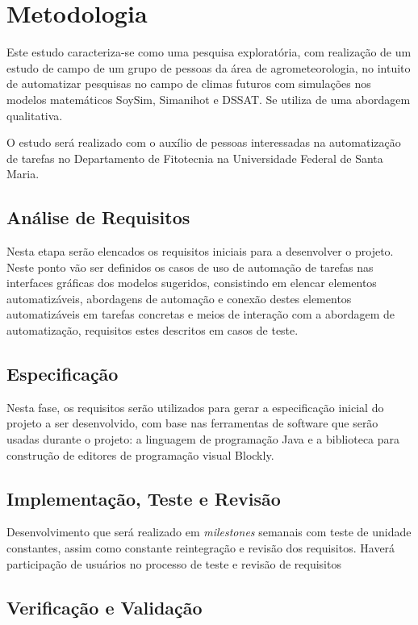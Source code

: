 \documentclass[12pt]{article}
\begin{document}
	
	\section{Metodologia}
	
	Este estudo caracteriza-se como uma pesquisa exploratória, com realização de um estudo de campo de um grupo de pessoas da área de agrometeorologia, no intuito de automatizar pesquisas no campo de climas futuros com simulações nos modelos matemáticos SoySim, Simanihot e DSSAT. Se utiliza de uma abordagem qualitativa.
	
	O estudo será realizado com o auxílio de pessoas interessadas na automatização de tarefas no Departamento de Fitotecnia na Universidade Federal de Santa Maria.

	\subsection{Análise de Requisitos}
	
	 Nesta etapa serão elencados os requisitos iniciais para a desenvolver o projeto. Neste ponto vão ser definidos os casos de uso de automação de tarefas nas interfaces gráficas dos modelos sugeridos, consistindo em elencar elementos automatizáveis, abordagens de automação e conexão destes elementos automatizáveis em tarefas concretas e meios de interação com a abordagem de automatização, requisitos estes descritos em casos de teste.
	
	\subsection{Especificação}
	Nesta fase, os requisitos serão utilizados para gerar a especificação inicial do projeto a ser desenvolvido, com base nas ferramentas de software que serão usadas durante o projeto: a linguagem de programação Java e a biblioteca para construção de editores de programação visual Blockly.
	
	
	\subsection{Implementação, Teste e Revisão}
	
	Desenvolvimento que será realizado em \emph{milestones} semanais com teste de unidade constantes, assim como constante reintegração e revisão dos requisitos. Haverá participação de usuários no processo de teste e revisão de requisitos     
    
    
    \subsection{Verificação e Validação}
    
\end{document}
